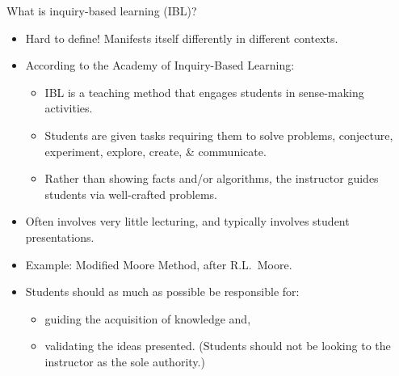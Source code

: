 \documentclass[10pt]{beamer}
\begin{document}
\begin{frame}

\begin{block}{What is inquiry-based learning (IBL)?}\pause
\begin{itemize}
\item Hard to define! Manifests itself differently in different contexts.\pause
\item According to the \alert{Academy of Inquiry-Based Learning}:
\begin{itemize}\normalsize
\item IBL is a teaching method that engages students in sense-making activities.
\item Students are given tasks requiring them to solve problems, conjecture, experiment, explore, create, \& communicate.
\item Rather than showing facts and/or algorithms, the instructor guides students via well-crafted problems. \pause
\end{itemize}
\item Often involves very little lecturing, and typically involves student presentations.\pause
\item Example: Modified Moore Method, after R.L.~Moore. \pause
\item Students should as much as possible be responsible for:
\begin{itemize}\normalsize
\item guiding the acquisition of knowledge and,
\item validating the ideas presented. (Students should not be looking to the instructor as the sole authority.)
\end{itemize}
\end{itemize}
\end{block}

\end{frame}

\end{document}
